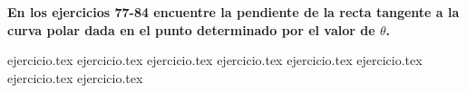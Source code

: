 \vspace{0.3cm}
\noindent\textbf{En los ejercicios 77-84 encuentre la pendiente de la recta tangente a la curva polar dada en el punto determinado por el valor de $\theta$.}
\begin{enumerate}
    \setcounter{enumi}{76}
    {ejercicio.tex}
{ejercicio.tex}
{ejercicio.tex}
{ejercicio.tex}
{ejercicio.tex}
{ejercicio.tex}
{ejercicio.tex}
{ejercicio.tex}
\end{enumerate}
